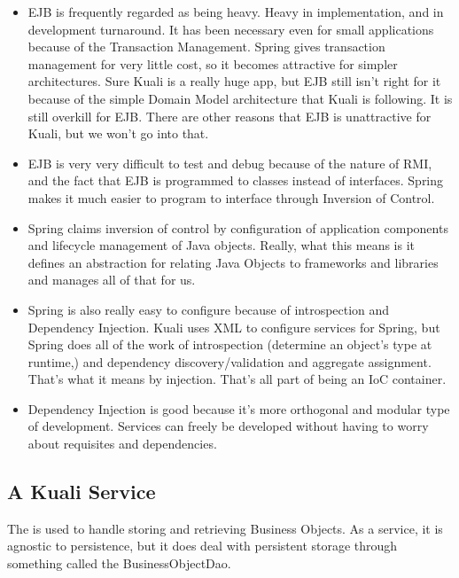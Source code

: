 \begin{ifhtml}
\begin{s5slide}
    \begin{s5notes}
      \begin{itemize}
        \item EJB is frequently regarded as being heavy. Heavy in implementation, and in development turnaround. It has been necessary
          even for small applications because of the Transaction Management. Spring gives transaction management for very little cost, 
          so it becomes attractive for simpler architectures. Sure Kuali is a really huge app, but EJB still isn't right for it because
          of the simple Domain Model architecture that Kuali is following. It is still overkill for EJB. There are other reasons that 
          EJB is unattractive for Kuali, but we won't go into that.
        \item EJB is very very difficult to test and debug because of the nature of RMI, and the fact that EJB is programmed to classes
          instead of interfaces. Spring makes it much easier to program to interface through Inversion of Control.
        \item Spring claims inversion of control by configuration of application components and lifecycle management of Java objects.
          Really, what this means is it defines an abstraction for relating Java Objects to frameworks and libraries and manages all of
          that for us.
        \item Spring is also really easy to configure because of introspection and Dependency Injection. Kuali uses XML to configure 
          services for Spring, but Spring does all of the work of introspection (determine an object's type at runtime,) and dependency 
          discovery/validation and aggregate assignment. That's what it means by injection. That's all part of being an IoC container.
        \item Dependency Injection is good because it's more orthogonal and modular type of development. Services can freely be 
          developed without having to worry about requisites and dependencies.
      \end{itemize}
    \end{s5notes} 
  \end{s5slide}

  \begin{s5slide}
    \section{A Kuali Service}
    The  is used to handle storing and retrieving Business Objects. As a service, it is agnostic to persistence,
    but it does deal with persistent storage through something called the BusinessObjectDao.


\end{s5slide}
\end{ifhtml}
